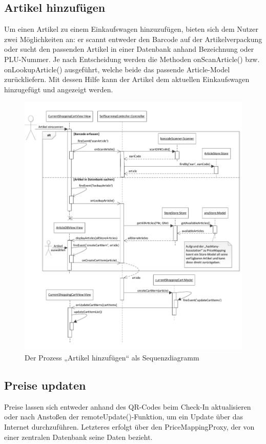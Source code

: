 \subsection{Artikel hinzufügen}
Um einen Artikel zu einem Einkaufswagen hinzuzufügen, bieten sich dem Nutzer zwei Möglichkeiten an: er scannt entweder den Barcode auf der Artikelverpackung oder sucht den passenden Artikel in einer Datenbank anhand Bezeichnung oder PLU-Nummer. Je nach Entscheidung werden die Methoden onScanArticle() bzw. onLookupArticle() ausgeführt, welche beide das passende Article-Model zurückliefern. Mit dessen Hilfe kann der Artikel dem aktuellen Einkaufswagen hinzugefügt und angezeigt werden.

\begin{figure}[H]
\includegraphics[width=\linewidth]{res/seq_artikel-hinzufuegen.pdf}
\caption{Der Prozess „Artikel hinzufügen“ als Sequenzdiagramm}
\end{figure}

\subsection{Preise updaten}
Preise lassen sich entweder anhand des QR-Codes beim Check-In aktualisieren oder nach Anstoßen der remoteUpdate()-Funktion, um ein Update über das Internet durchzuführen. Letzteres erfolgt über den PriceMappingProxy, der von einer zentralen Datenbank seine Daten bezieht.

